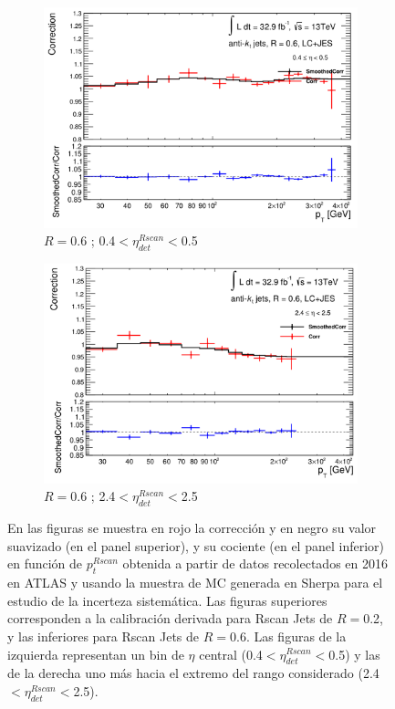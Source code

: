\begin{figure}[ht]
\begin{subfigure}[b]{0.495\textwidth}
        \includegraphics[width=\textwidth]{images/Smo_6LC_pt_49_Sherpa.png}
        \caption{$R=$0.6 ; 0.4$<\eta^{Rscan}_{det}<$0.5}
    \end{subfigure}
    \hfill
    \begin{subfigure}[b]{0.495\textwidth}
        \centering
        \includegraphics[width=\textwidth]{images/Smo_6LC_pt_69_Sherpa.png}
        \caption{$R=$0.6 ; 2.4$<\eta^{Rscan}_{det}<$2.5}
    \end{subfigure}
    \caption{  En las figuras se muestra en rojo la corrección y en negro su valor suavizado (en el panel superior), y su cociente (en el panel inferior) en función de $p_t^{Rscan}$ obtenida a partir de datos recolectados en 2016 en ATLAS y usando la muestra de MC generada en Sherpa para el estudio de la incerteza sistemática. Las figuras superiores corresponden a la calibración derivada para Rscan Jets de $R=$0.2, y las inferiores para Rscan Jets de $R=$0.6. Las figuras de la izquierda representan un bin de $\eta$ central (0.4$<\eta^{Rscan}_{det}<$0.5) y las de la derecha uno más hacia el extremo del rango considerado (2.4$<\eta^{Rscan}_{det}<$2.5).} 
    \label{fig:SmootherSherpa}
\end{figure}

